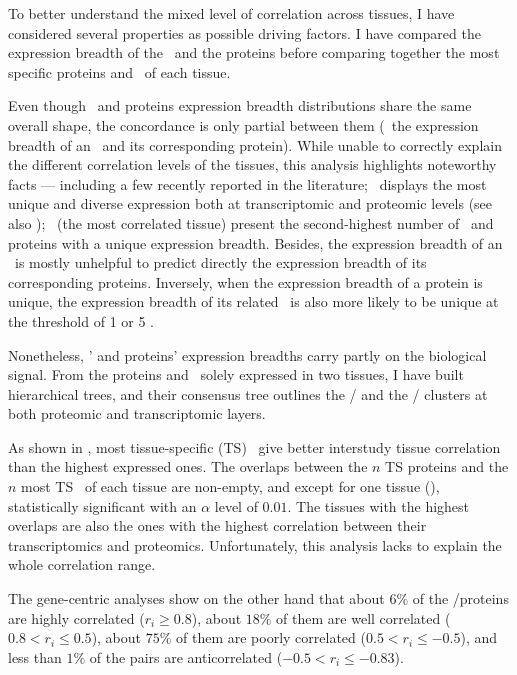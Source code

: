 To better understand the mixed level of correlation across tissues,
I have considered several properties as possible driving factors.
I have compared the expression breadth of the \mRNAs\ and the proteins
before comparing together the most specific proteins and \mRNAs\ of each tissue.\mybr\

Even though \mRNAs\ and proteins expression breadth distributions share
the same overall shape,
the concordance is only partial between them
(\ie\ the expression breadth of an \mRNA\ and its corresponding protein).
While unable to correctly explain the different correlation levels of the tissues,
this analysis highlights noteworthy facts
--- including a few recently reported in the literature;
\testis\ displays the most unique and diverse expression
both at transcriptomic and proteomic levels
(see also \citet{Wang2019-ut,Zhang2015-yn});
\liver\ (the most correlated tissue) present the second-highest number
of \mRNAs\ and proteins with a unique expression breadth.
Besides, the expression breadth of an \mRNA\ is mostly unhelpful
to predict directly the expression breadth of its corresponding proteins.
Inversely, when the expression breadth of a protein is unique,
the expression breadth of its related \mRNA\ is also more likely to be unique
at the threshold of 1 or 5 \FPKM{}.

Nonetheless, \mRNAs{}' and proteins' expression breadths carry partly on
the biological signal.
From the proteins and \mRNAs\ solely expressed in two tissues,
I have built hierarchical trees,
and their consensus tree outlines
the \ovary{}/\testis{} and the \kidney{}/\liver{} clusters
at both proteomic and transcriptomic layers.\mybr\

As shown in ,
most tissue-specific (\gls{TS}) \mRNAs\ give better
interstudy tissue correlation
than the highest expressed ones.
The overlaps between the $n$ \gls{TS} proteins and
the $n$ most \gls{TS} \mRNAs\ of each tissue are non-empty,
and except for one tissue (),
statistically significant with an $\alpha$ level of $0.01$.
The tissues with the highest overlaps are
also the ones with the highest correlation
between their transcriptomics and proteomics.
Unfortunately, this analysis lacks to explain
the whole correlation range.\mybr\

The gene-centric analyses show on the other hand that
about $6\%$ of the \mRNAs/proteins are highly correlated ($r_i≥0.8$),
about $18\%$ of them are well correlated ($0.8 < r_i ≤ 0.5$),
about $75\%$ of them are poorly correlated ($0.5 < r_i ≤ -0.5$), and
less than $1\%$ of the pairs are anticorrelated ($-0.5 < r_i ≤ -0.83$).

